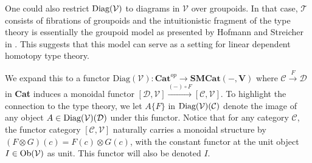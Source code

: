 One could also restrict $\operatorname{\text{Diag}}(\mathcal{V})$ to diagrams in $\mathcal{V}$ over groupoids. In that case, $\mathcal{T}$ consists of fibrations of groupoids and the intuitionistic fragment of the type theory is essentially the groupoid model as presented by Hofmann and Streicher in \cite{hofmann1998}. This suggests that this model can serve as a setting for linear dependent homotopy type theory.


We expand this to a functor $\text{Diag}(\mathcal{V}) : \mathbf{Cat}^{op} \to \mathbf{SMCat(-,V)}$ where $\mathcal{C} \xrightarrow{F} \mathcal{D}$ in \textbf{Cat} induces a monoidal functor $[\mathcal{D}, \mathcal{V}] \xrightarrow{(-) \circ F} [\mathcal{C}, \mathcal{V}]$. To highlight the connection to the type theory, we let $A\{F\}$ in  $\operatorname{\text{Diag}}(\mathcal{V})(\mathcal{C})$ denote the image of any object $A \in \operatorname{\text{Diag}}(\mathcal{V})(\mathcal{D})$ under this functor. Notice that for any category $\mathcal{C}$, the functor category $[\mathcal{C}, \mathcal{V}]$ naturally carries a monoidal structure by $(F \otimes G)(c) = F(c) \otimes G(c)$, with the constant functor at the unit object $I \in \mathcal{\operatorname{\text{Ob}}(V)}$ as unit. This functor will also be denoted $I$.

